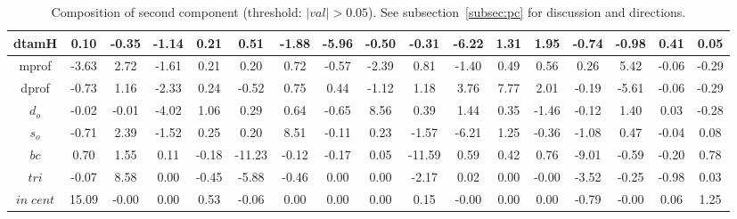 \documentclass[%
 aip,
 jmp,%
 amsmath,amssymb,
 reprint,%
 floatfix,
]{revtex4-1}
\begin{document}
\begin{table}
\begin{tabular}{|c|| c|c|c|c|| c|c|c|c|| c|c|c|c|| c|c|c|c|}
dtamH & 0.10 & -0.35 & -1.14 & 0.21 & 0.51 & -1.88 & -5.96 & -0.50 & -0.31 & -6.22 & 1.31 & 1.95 & -0.74 & -0.98 & 0.41 & 0.05 \\\hline
mprof & -3.63 & 2.72 & -1.61 & 0.21 & 0.20 & 0.72 & -0.57 & -2.39 & 0.81 & -1.40 & 0.49 & 0.56 & 0.26 & 5.42 & -0.06 & -0.29 \\\hline
dprof & -0.73 & 1.16 & -2.33 & 0.24 & -0.52 & 0.75 & 0.44 & -1.12 & 1.18 & 3.76 & 7.77 & 2.01 & -0.19 & -5.61 & -0.06 & -0.29 \\\hline
$d_o$ & -0.02 & -0.01 & -4.02 & 1.06 & 0.29 & 0.64 & -0.65 & 8.56 & 0.39 & 1.44 & 0.35 & -1.46 & -0.12 & 1.40 & 0.03 & -0.28 \\\hline
$s_o$ & -0.71 & 2.39 & -1.52 & 0.25 & 0.20 & 8.51 & -0.11 & 0.23 & -1.57 & -6.21 & 1.25 & -0.36 & -1.08 & 0.47 & -0.04 & 0.08 \\\hline
$bc$ & 0.70 & 1.55 & 0.11 & -0.18 & -11.23 & -0.12 & -0.17 & 0.05 & -11.59 & 0.59 & 0.42 & 0.76 & -9.01 & -0.59 & -0.20 & 0.78 \\\hline
$tri$ & -0.07 & 8.58 & 0.00 & -0.45 & -5.88 & -0.46 & 0.00 & 0.00 & -2.17 & 0.02 & 0.00 & -0.00 & -3.52 & -0.25 & -0.98 & 0.03 \\\hline
$in\;cent$ & 15.09 & -0.00 & 0.00 & 0.53 & -0.06 & 0.00 & 0.00 & 0.00 & 0.15 & -0.00 & 0.00 & 0.00 & -0.79 & -0.00 & 0.06 & 1.25 \\\hline
\end{tabular}
  \caption{Composition of second component (threshold: $|val|>0.05$). See subsection~\ref{subsec:pc} for discussion and directions.}\label{tab:pca2}
\end{table}
\end{document}
